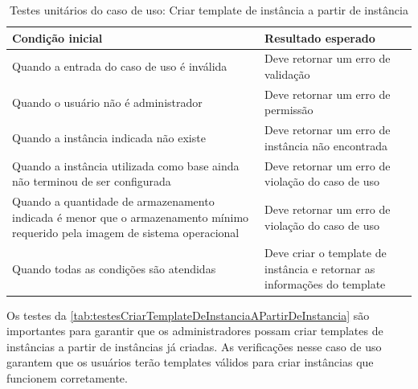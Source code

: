 \begin{table}[h]
\caption{Testes unitários do caso de uso: Criar template de instância a partir de instância}
\label{tab:testesCriarTemplateDeInstanciaAPartirDeInstancia}
\begin{tabularx}{\textwidth}{p{} p{}}
\toprule
\textbf{Condição inicial} & \textbf{Resultado esperado} \\ \midrule

Quando a entrada do caso de uso é inválida & Deve retornar um erro de validação \\ \hline

Quando o usuário não é administrador & Deve retornar um erro de permissão \\ \hline

Quando a instância indicada não existe & Deve retornar um erro de instância não encontrada \\ \hline

Quando a instância utilizada como base ainda não terminou de ser configurada & Deve retornar um erro de violação do caso de uso \\ \hline

Quando a quantidade de armazenamento indicada é menor que o armazenamento mínimo requerido pela imagem de sistema operacional & Deve retornar um erro de violação do caso de uso \\ \hline

Quando todas as condições são atendidas & Deve criar o template de instância e retornar as informações do template \\

\bottomrule
\end{tabularx}
\end{table}

Os testes da \autoref{tab:testesCriarTemplateDeInstanciaAPartirDeInstancia} são importantes para garantir que os administradores possam criar templates de instâncias a partir de instâncias já criadas. As verificações nesse caso de uso garantem que os usuários terão templates válidos para criar instâncias que funcionem corretamente.

